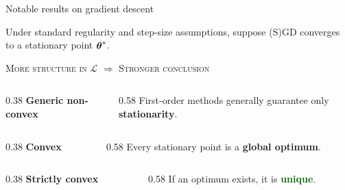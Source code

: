 \documentclass[12pt,aspectratio=169]{beamer}
\begin{document}
\begin{frame}{Notable results on gradient descent}

	\small

	\begin{tcolorbox}[colback=light-gray,colframe=gray,
		top=1.2mm,bottom=1.2mm,left=3mm,right=3mm]
		\small
		Under standard regularity and step-size assumptions, suppose (S)GD
		converges to a stationary point $\boldsymbol{\mathbf{\theta}}^*$.
	\end{tcolorbox}

	\vspace{-0.18cm}
	\begin{center}
		\small\textsc{More structure in $\mathcal{L}$}
		\qquad$\Longrightarrow$\qquad
		\textsc{Stronger conclusion}
	\end{center}
	\vspace{-0.25cm}

	\begin{tcolorbox}[colback=light-gray,colframe=gray,boxrule=0.7pt,
		top=0.8mm,bottom=0.8mm,left=3mm,right=3mm,arc=1.5mm]
		\begin{columns}[onlytextwidth]
			\begin{column}{0.38\textwidth}
				\textbf{Generic non-convex}
			\end{column}
			\begin{column}{0.58\textwidth}
				First-order methods generally guarantee only
				\textbf{stationarity}.
			\end{column}
		\end{columns}
	\end{tcolorbox}
	\vspace{0.06cm}
	\begin{tcolorbox}[colback=darkcerulean!6,colframe=darkcerulean,boxrule=0.7pt,
		top=0.8mm,bottom=0.8mm,left=3mm,right=3mm,arc=1.5mm]
		\begin{columns}[onlytextwidth]
			\begin{column}{0.38\textwidth}
				\textbf{Convex}
			\end{column}
			\begin{column}{0.58\textwidth}
				Every stationary point is a
				\textbf{\textcolor{darkcerulean}{global optimum}}.
			\end{column}
		\end{columns}
	\end{tcolorbox}
	\vspace{0.06cm}
	\begin{tcolorbox}[colback=darkgreen!6,colframe=darkgreen,boxrule=0.7pt,
		top=0.8mm,bottom=0.8mm,left=3mm,right=3mm,arc=1.5mm]
		\begin{columns}[onlytextwidth]
			\begin{column}{0.38\textwidth}
				\textbf{Strictly convex}
			\end{column}
			\begin{column}{0.58\textwidth}
				If an optimum exists, it is
				\textbf{\textcolor{darkgreen}{unique}}.
			\end{column}
		\end{columns}
	\end{tcolorbox}


\end{frame}
\end{document}
